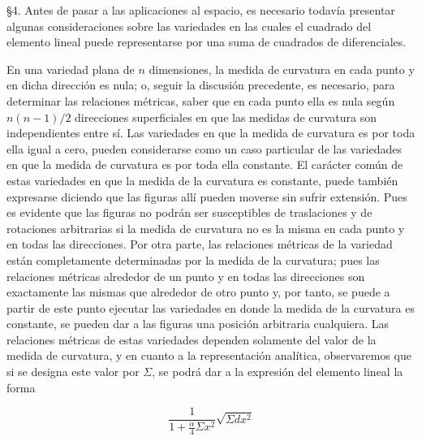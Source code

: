 \documentclass[a4paper, 12pt]{article}
\begin{document}
\bigskip

\S 4.\hspace{3 mm} Antes de pasar a las aplicaciones al espacio, es necesario todavía presentar algunas consideraciones sobre las variedades en las cuales el cuadrado del elemento lineal puede representarse por una suma de cuadrados de diferenciales. 

En una variedad plana de $n$ dimensiones, la medida de curvatura en cada punto y en dicha dirección es nula; o, seguir la discusión precedente, es necesario, para determinar las relaciones métricas, saber que en cada punto ella es nula según $n(n-1)/2$ direcciones superficiales en que las medidas de curvatura son independientes entre sí. Las variedades en que la medida de curvatura es por toda ella igual a cero, pueden considerarse como un caso particular de las variedades en que la medida de curvatura es por toda ella constante. El carácter común de estas variedades en que la medida de la curvatura es constante, puede también expresarse diciendo que las figuras allí pueden moverse sin sufrir extensión. Pues es evidente que las figuras no podrán ser susceptibles de traslaciones y de rotaciones arbitrarias si la medida de curvatura no es la misma en cada punto y en todas las direcciones. Por otra parte, las relaciones métricas de la variedad están completamente determinadas por la medida de la curvatura; pues las relaciones métricas alrededor de un punto y en todas las direcciones son exactamente las mismas que alrededor de otro punto y, por tanto, se puede a partir de este punto ejecutar las variedades en donde la medida de la curvatura es constante, se pueden dar a las figuras una posición arbitraria cualquiera. Las relaciones métricas de estas variedades dependen solamente del valor de la medida de curvatura, y en cuanto a la representación analítica, observaremos que si se designa este valor por $\Sigma$, se podrá dar a la expresión del elemento lineal la forma

\[
\frac{1}{1+\frac{\alpha}{4} \Sigma x^2}\sqrt{\Sigma dx^2}
\]

\bigskip
\end{document}
